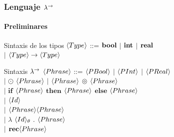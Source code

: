 \documentclass{beamer}
\begin{document}
\begin{frame}
\frametitle{Lenguaje $\lambda^{\rightarrow}$}
\framesubtitle{Preliminares}

\begin{block}{Sintaxis de los tipos}
$\langle Type \rangle$ ::= $\textbf{bool}$ $|$ $\textbf{int}$ $|$ $\textbf{real}$\\
\quad \quad \quad \quad
$|$ $\langle Type \rangle \rightarrow \langle Type \rangle$\\
\end{block}

\begin{block}{Sintaxis $\lambda^{\rightarrow}$}
$\langle Phrase \rangle$ ::= $\langle PBool \rangle$ $|$ $\langle PInt \rangle$ $|$ $\langle PReal \rangle$\\
\quad \quad \quad \quad \quad
$|$ $\odot$ $\langle Phrase \rangle$ $|$ $\langle Phrase \rangle$ $\circledcirc$ $\langle Phrase \rangle$\\
\quad \quad \quad \quad \quad
$|$ $\textbf{if}$ $\langle Phrase \rangle$ $\textbf{then}$ $\langle Phrase \rangle$ $\textbf{else}$ $\langle Phrase \rangle$\\
\quad \quad \quad \quad \quad
$|$ $\langle Id \rangle$\\
\quad \quad \quad \quad  \quad
$|$ $\langle Phrase \rangle\langle Phrase \rangle$\\
\quad \quad \quad \quad  \quad
$|$ $\lambda$ $\langle Id \rangle_\theta$ . $\langle Phrase \rangle$\\
\quad \quad \quad \quad  \quad
$|$ $\textbf{rec} \langle Phrase \rangle$\\
\end{block}

\end{frame}
\end{document}
